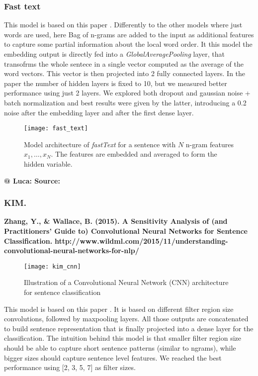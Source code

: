 \subsubsection{Fast text}
This model is based on this paper \cite{joulin2016bag}.
Differently to the other models where just words are used, here Bag of n-grams are added to the input as  additional features to capture some partial information about the local word order.
It this model the embedding output is directly fed into a \emph{GlobalAveragePooling} layer, that transofrms the whole sentece in a single vector computed as the average of the word vectors.
This vector is then projected into 2 fully connected layers. In the paper the number of hidden layers is fixed to 10, but we measured better performance using just 2 layers.
We explored both dropout and gaussian noise + batch normalization and best results were given by the latter, introducing a 0.2 noise after the embedding layer and after the first dense layer.
\begin{figure}[h]
\centering
\texttt{[image: fast\_text]}
\caption{\cite{joulin2016bag} Model architecture of \emph{fastText} for a sentence with $N$ n-gram features $x_1,\dots,x_N$. The features are embedded and averaged to form the hidden variable.}
\label{fig:fastText}
\end{figure}
\textbf{@ Luca: Source:  }


\subsubsection{KIM.}

\textbf{Zhang, Y., \& Wallace, B. (2015). A Sensitivity Analysis of (and Practitioners’ Guide to) Convolutional Neural Networks for Sentence Classification.}
\textbf{http://www.wildml.com/2015/11/understanding-convolutional-neural-networks-for-nlp/}

\begin{figure}[h]
\centering
\texttt{[image: kim\_cnn]}
\caption{Illustration of a Convolutional Neural Network (CNN) architecture for sentence classification}
\label{fig:kim}
\end{figure}

This model is based on this paper \cite{kim2014convolutional}. It is based on different filter region size convolutions, followed by maxpooling layers.
All those outputs are concatenated to build sentence representation that is finally projected into a dense layer for the classification.
The intuition behind this model is that smaller filter region size should be able to capture short sentence patterns (similar to ngrams), while bigger sizes should capture sentence level features. We reached the best performance using [2, 3, 5, 7] as filter sizes.
